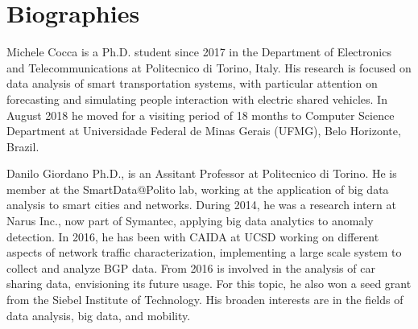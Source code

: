 \section*{Biographies}

\begin{IEEEbiography} {Michele Cocca} is a Ph.D. student since 2017 in the Department of Electronics and Telecommunications at Politecnico di Torino, Italy. His research is focused on data analysis of smart transportation systems, with particular attention on forecasting and simulating people interaction with electric shared vehicles. In August 2018 he moved for a visiting period of 18 months to Computer Science Department at Universidade Federal de Minas Gerais (UFMG), Belo Horizonte, Brazil.
\end{IEEEbiography}


\begin{IEEEbiography} {Danilo Giordano} Ph.D., is an Assitant Professor at Politecnico di Torino. He is member at the SmartData@Polito lab, working at the application of big data analysis to smart cities and networks. During 2014, he was a research intern at Narus Inc., now part of Symantec, applying big data analytics to anomaly detection. In 2016, he has been with CAIDA at UCSD working on different aspects of network traffic characterization, implementing a large scale system to collect and analyze BGP data. From 2016 is involved in the analysis of car sharing data, envisioning its future usage. For this topic, he also won a seed grant from the Siebel Institute of Technology.  His broaden interests are in the fields of data analysis, big data, and mobility.
\end{IEEEbiography}





